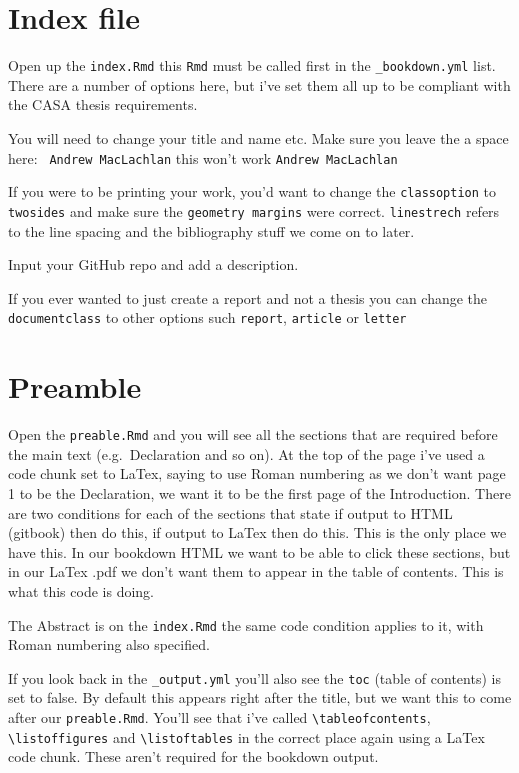\documentclass[
  12pt,
  oneside]{book}
\begin{document}
\hypertarget{index-file}{%
\section{Index file}\label{index-file}}

Open up the \texttt{index.Rmd} this \texttt{Rmd} must be called first in the \texttt{\_bookdown.yml} list. There are a number of options here, but i've set them all up to be compliant with the CASA thesis requirements.

You will need to change your title and name etc. Make sure you leave the a space here: \texttt{\textbar{}\ Andrew\ MacLachlan} this won't work \texttt{\textbar{}Andrew\ MacLachlan}

If you were to be printing your work, you'd want to change the \texttt{classoption} to \texttt{twosides} and make sure the \texttt{geometry\ margins} were correct. \texttt{linestrech} refers to the line spacing and the bibliography stuff we come on to later.

Input your GitHub repo and add a description.

If you ever wanted to just create a report and not a thesis you can change the \texttt{documentclass} to other options such \texttt{report}, \texttt{article} or \texttt{letter}

\hypertarget{preamble}{%
\section{Preamble}\label{preamble}}

Open the \texttt{preable.Rmd} and you will see all the sections that are required before the main text (e.g.~Declaration and so on). At the top of the page i've used a code chunk set to LaTex, saying to use Roman numbering as we don't want page 1 to be the Declaration, we want it to be the first page of the Introduction. There are two conditions for each of the sections that state if output to HTML (gitbook) then do this, if output to LaTex then do this. This is the only place we have this. In our bookdown HTML we want to be able to click these sections, but in our LaTex .pdf we don't want them to appear in the table of contents. This is what this code is doing.

The Abstract is on the \texttt{index.Rmd} the same code condition applies to it, with Roman numbering also specified.

If you look back in the \texttt{\_output.yml} you'll also see the \texttt{toc} (table of contents) is set to false. By default this appears right after the title, but we want this to come after our \texttt{preable.Rmd}. You'll see that i've called \texttt{\textbackslash{}tableofcontents}, \texttt{\textbackslash{}listoffigures} and \texttt{\textbackslash{}listoftables} in the correct place again using a LaTex code chunk. These aren't required for the bookdown output.
\end{document}
